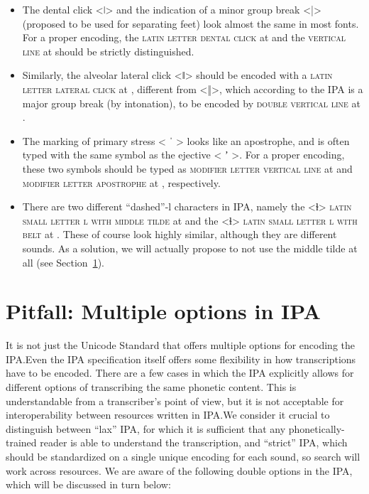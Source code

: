 \begin{itemize}
  
   \item The dental click <ǀ> and the indication of a minor group break <|>
           (proposed to be used for separating feet) look almost the same in
           most fonts. For a proper encoding, the \textsc{latin letter dental
           click} at  and the \textsc{vertical line }at  
           should be strictly distinguished.
   \item Similarly, the alveolar lateral click <ǁ>	should be encoded with a
           \textsc{latin letter lateral click} at , different from <‖>, 
           which according to the IPA is a major group break (by intonation), to be
           encoded by \textsc{double vertical line} at .
   \item The marking of primary stress < ˈ > looks like an apostrophe, and
           is often typed with the same symbol as the ejective < ʼ >. For a
           proper encoding, these two symbols should be typed as 
           \textsc{modifier letter vertical line} at  and
           \textsc{modifier letter apostrophe} at , respectively. 
   \item There are two different ``dashed''-l characters in IPA, namely the <ɫ> 	      \textsc{latin small letter l with middle tilde} at  and the <ɬ>	      \textsc{latin small letter l with belt} at . These of course
          look highly similar, although they are different sounds. As a solution, 
          we will actually propose to not use the middle tilde at all 
          (see Section~\ref{pitfall-multiple-options-ipa}).     
   
\end{itemize}

\section{Pitfall: Multiple options in IPA}
\label{pitfall-multiple-options-ipa}     

It is not just the Unicode Standard that offers multiple options for encoding
the IPA.\@ Even the IPA specification itself offers some flexibility in how
transcriptions have to be encoded. There are a few cases in which the IPA
explicitly allows for different options of transcribing the same phonetic
content. This is understandable from a transcriber's point of view, but it is
not acceptable for interoperability between resources written in IPA.\@ We
consider it crucial to distinguish between ``lax'' IPA, for which it is
sufficient that any phonetically-trained reader is able to understand the
transcription, and ``strict'' IPA, which should be standardized on a single
unique encoding for each sound, so search will work across resources. We are 
aware of the following double options in the IPA, which will be discussed in 
turn below:

